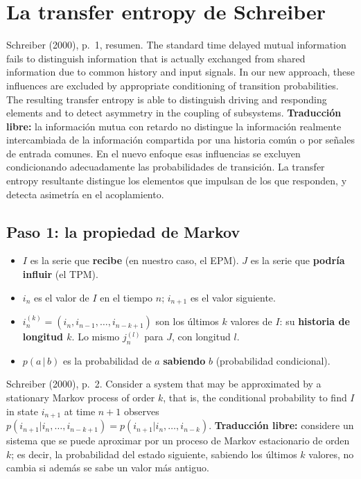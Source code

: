 \documentclass[11pt,openany]{book}
\begin{document}
\chapter{La transfer entropy de Schreiber}\label{cap:te}

\begin{cita}{Schreiber (2000), p.~1, resumen.}
The standard time delayed mutual information fails to distinguish information that is actually exchanged from shared information due to common history and input signals. In our new approach, these influences are excluded by appropriate conditioning of transition probabilities. The resulting transfer entropy is able to distinguish driving and responding elements and to detect asymmetry in the coupling of subsystems.
\tcblower
\textbf{Traducción libre:} la información mutua con retardo no distingue la información realmente intercambiada de la información compartida por una historia común o por señales de entrada comunes. En el nuevo enfoque esas influencias se excluyen condicionando adecuadamente las probabilidades de transición. La transfer entropy resultante distingue los elementos que impulsan de los que responden, y detecta asimetría en el acoplamiento.
\end{cita}

\section{Paso 1: la propiedad de Markov}

\begin{nota}
\begin{itemize}
\item $I$ es la serie que \textbf{recibe} (en nuestro caso, el EPM). $J$ es la serie que \textbf{podría influir} (el TPM).
\item $i_n$ es el valor de $I$ en el tiempo $n$; $i_{n+1}$ es el valor siguiente.
\item $i_n^{(k)} = (i_n, i_{n-1}, \dots, i_{n-k+1})$ son los últimos $k$ valores de $I$: su \textbf{historia de longitud $k$}. Lo mismo $j_n^{(l)}$ para $J$, con longitud $l$.
\item $p(a\,|\,b)$ es la probabilidad de $a$ \textbf{sabiendo} $b$ (probabilidad condicional).
\end{itemize}
\end{nota}

\begin{cita}{Schreiber (2000), p.~2.}
Consider a system that may be approximated by a stationary Markov process of order $k$, that is, the conditional probability to find $I$ in state $i_{n+1}$ at time $n+1$ observes $p(i_{n+1}|i_n,\dots,i_{n-k+1}) = p(i_{n+1}|i_n,\dots,i_{n-k})$.
\tcblower
\textbf{Traducción libre:} considere un sistema que se puede aproximar por un proceso de Markov estacionario de orden $k$; es decir, la probabilidad del estado siguiente, sabiendo los últimos $k$ valores, no cambia si además se sabe un valor más antiguo.
\end{cita}
\end{document}
